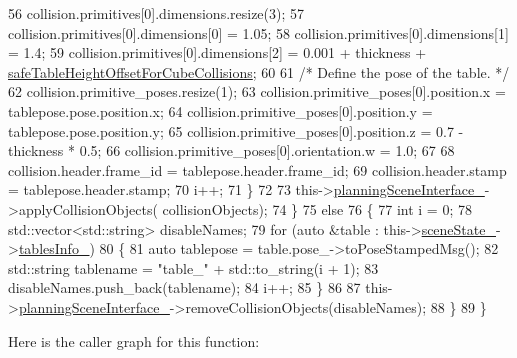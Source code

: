 \begin{DoxyCode}
56                     collision.primitives[0].dimensions.resize(3);
57                     collision.primitives[0].dimensions[0] = 1.05;
58                     collision.primitives[0].dimensions[1] = 1.4;
59                     collision.primitives[0].dimensions[2] = 0.001 + thickness + 
      \hyperlink{classsm__moveit__4_1_1move__group__interface__client_1_1CpConstraintTableWorkspaces_a3f9ba91578890ba9a146c678e3630d9f}{safeTableHeightOffsetForCubeCollisions};
60 
61                     \textcolor{comment}{/* Define the pose of the table. */}
62                     collision.primitive\_poses.resize(1);
63                     collision.primitive\_poses[0].position.x = tablepose.pose.position.x;
64                     collision.primitive\_poses[0].position.y = tablepose.pose.position.y;
65                     collision.primitive\_poses[0].position.z = 0.7 - thickness * 0.5;
66                     collision.primitive\_poses[0].orientation.w = 1.0;
67 
68                     collision.header.frame\_id = tablepose.header.frame\_id;
69                     collision.header.stamp = tablepose.header.stamp;
70                     i++;
71                 \}
72 
73                 this->\hyperlink{classsm__moveit__4_1_1move__group__interface__client_1_1CpConstraintTableWorkspaces_a03f866282a64d14a33d180a53e43d850}{planningSceneInterface\_}->applyCollisionObjects(
      collisionObjects);
74             \}
75             \textcolor{keywordflow}{else}
76             \{
77                 \textcolor{keywordtype}{int} i = 0;
78                 std::vector<std::string> disableNames;
79                 \textcolor{keywordflow}{for} (\textcolor{keyword}{auto} &table : this->\hyperlink{classsm__moveit__4_1_1move__group__interface__client_1_1CpConstraintTableWorkspaces_aee8b5f525a640819e13271dc68f5d4e2}{sceneState\_}->\hyperlink{classsm__moveit__4_1_1cl__perception__system_1_1CpSceneState_a95f74dd16566d97e017650ccdf4b8a46}{tablesInfo\_})
80                 \{
81                     \textcolor{keyword}{auto} tablepose = table.pose\_->toPoseStampedMsg();
82                     std::string tablename = \textcolor{stringliteral}{"table\_"} + std::to\_string(i + 1);
83                     disableNames.push\_back(tablename);
84                     i++;
85                 \}
86 
87                 this->\hyperlink{classsm__moveit__4_1_1move__group__interface__client_1_1CpConstraintTableWorkspaces_a03f866282a64d14a33d180a53e43d850}{planningSceneInterface\_}->removeCollisionObjects(disableNames);
88             \}
89         \}
\end{DoxyCode}
Here is the caller graph for this function\+:
